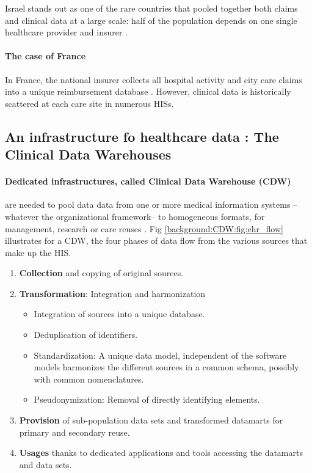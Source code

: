 \documentclass[french,12pt,twoside,a4paper]{book}
\begin{document}
\begin{background_box_left}
  Israel stands out as one of the rare countries that pooled together both claims
  and clinical data at a large scale: half of the population depends on one single
  healthcare provider and insurer \citep{clalit_data_2023}.

  \paragraph{The case of France}

  In France, the national insurer collects all hospital activity and city care
  claims into a unique reimbursement database \citep{tuppin_value_2017}. However,
  clinical data is historically scattered at each care site in numerous HISs.

\end{background_box_left}


\subsection{An infrastructure fo healthcare data : The Clinical Data
  Warehouses}%
\label{subsec:cdw:cdw_definition}%

\paragraph{Dedicated infrastructures, called Clinical Data Warehouse (CDW)} are
needed to pool data data from one or more medical information systems --whatever
the organizational framework-- to homogeneous formats, for management, research
or care reuses \citep{chute_enterprise_2010,pavlenko_implementation_2020}. Fig
\ref{background:CDW:fig:ehr_flow} illustrates for a CDW, the four phases of data
flow from the various sources that make up the HIS.

\begin{enumerate}
  \item \textbf{Collection} and copying of original sources.
  \item \textbf{Transformation}: Integration and harmonization
        \begin{itemize}
          \item Integration of sources into a unique database.
          \item Deduplication of identifiers.
          \item Standardization: A unique data model, independent of the
                software models harmonizes the different sources in a common schema,
                possibly with common nomenclatures.
          \item Pseudonymization: Removal of directly identifying elements.
        \end{itemize}
  \item \textbf{Provision} of sub-population data sets and transformed datamarts
        for primary and secondary reuse.
  \item \textbf{Usages} thanks to dedicated applications and tools accessing the
        datamarts and data sets.
\end{enumerate}
\end{document}
